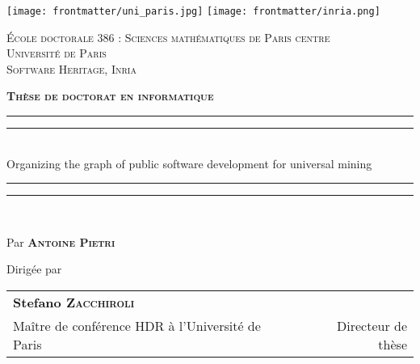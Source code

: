 \begin{titlingpage}
\begin{SingleSpace}
\calccentering{\unitlength}

\texttt{[image: frontmatter/uni\_paris.jpg]}  \hfill
\texttt{[image: frontmatter/inria.png]} \hfill
{}

\begin{center}

    \textsc{École doctorale 386 : Sciences mathématiques de Paris centre}\\
\vspace{2mm}
\textsc{Université de Paris}\\
\vspace{2mm}
\textsc{Software Heritage, Inria}\\

\vspace{4mm}

\textsc{\Large \textbf{Thèse de doctorat en informatique}}\\

\vspace*{2mm}

\rule[0.5ex]{\linewidth}{2pt}\vspace*{-\baselineskip}\vspace*{3.2pt}
\rule[0.5ex]{\linewidth}{1pt}\\[\baselineskip]
\vspace{-0.35cm}
{\huge Organizing the graph of public software development for universal mining}\\
\rule[0.5ex]{\linewidth}{1pt}\vspace*{-\baselineskip}\vspace*{3.4pt}
\rule[0.5ex]{\linewidth}{2pt}\\

\vspace{2mm}

{\LARGE Par } {\LARGE\textsc{\textbf{Antoine Pietri}}}\\

\vspace{5mm}

{\large Dirigée par }\\

\vspace{3mm}

\begin{tabular}{lr}
  \textbf{Stefano {\scshape Zacchiroli}} & \\
  Maître de conférence HDR à l'Université de Paris \hspace{17mm} &
  Directeur de thèse \\
\end{tabular}


\end{center}
\end{SingleSpace}
\end{titlingpage}
